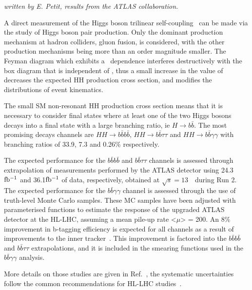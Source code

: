 \begin{center}
\textit{written by E. Petit, results from the ATLAS collaboration.}


\end{center}

A direct measurement of the Higgs boson trilinear self-coupling \lHHH\ can be made via the study of Higgs boson pair production. Only the dominant production mechanism at hadron colliders, gluon fusion, is considered, with the other production mechanisms being more than an order magnitude smaller.
The Feyman diagram which exhibits a \lHHH\ dependence interferes destructively with the box diagram that is independent of \lHHH, thus a small increase in the value of \lHHH decreases the expected HH production cross section, and modifies the distributions of event kinematics.

The small SM non-resonant HH production cross section means that it is necessary to consider final states where at least one of the two Higgs bosons decays into a final state with a large branching ratio, ie $H \rightarrow b\bar{b}$. The most promising decays channels are $HH \rightarrow b\bar{b}b\bar{b}$, $HH \rightarrow b\bar{b}\tau\tau$ and $HH \rightarrow b\bar{b}\gamma\gamma$ with branching ratios of 33.9, 7.3 and 0.26\% respectively.

The expected performance for the $b\bar{b}b\bar{b}$ and $b\bar{b}\tau\tau$ channels is assessed through extrapolation of measurements performed by the ATLAS detector using 24.3~$\mbox{fb$^{-1}$}$ and 36.1$\mbox{fb$^{-1}$}$ of data, respectively, obtained at $\sqrt{s} = 13$~\UTeV\ during Run 2.
The expected performance for the $b\bar{b}\gamma\gamma$ channel is assessed through the use of truth-level Monte Carlo samples. 
These MC samples have been adjusted with parameterised functions to estimate the response of the upgraded ATLAS detector at the HL-LHC, assuming a mean pile-up rate <$\mu$> = 200. 
An 8\% improvement in b-tagging efficiency is expected for all channels as a result of improvements to the inner tracker~\cite{ITKPixelTDR}.
This improvement is factored into the $b\bar{b}b\bar{b}$ and $b\bar{b}\tau\tau$ extrapolations, and it is included in the smearing functions used in the $b\bar{b}\gamma\gamma$ analysis.

More details on those studies are given in Ref.~\cite{ATLASHHPUBnote}, the systematic uncertainties follow the common recommendations for HL-LHC studies~\cite{ATLASperfPUBnote}. 



